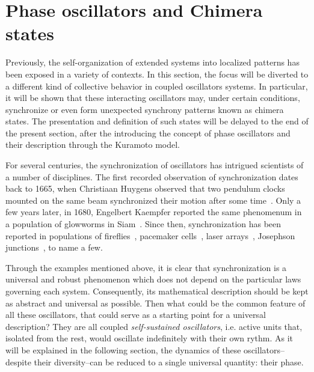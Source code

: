 \section{Phase oscillators and Chimera states}

Previously, the self-organization of extended systems into localized patterns has been exposed
in a variety of contexts. In this section, the focus will be diverted to a different kind of
collective behavior in coupled oscillators systems. In particular, it will be shown
that these interacting oscillators may, under certain conditions, synchronize or even
form unexpected synchrony patterns known as chimera states. The presentation and
definition of such states will be delayed to the end of the present section, after
the introducing the concept of phase oscillators and their description
through the Kuramoto model.

For several centuries, the synchronization of oscillators has intrigued scientists
of a number of disciplines. The first recorded observation of synchronization
dates back to 1665, when Christiaan Huygens observed that two pendulum clocks
mounted on the same beam synchronized their motion after some time~\cite{huygens1673horologium}.
Only a few years later, in 1680, Engelbert Kaempfer reported the same phenomenum
in a population of glowworms in Siam~\cite{kaempfer1727history}. Since then, synchronization has been
reported in populations of fireflies~\cite{buck1988synchronous}, pacemaker cells~\cite{michaels1987mechanisms}, 
laser arrays~\cite{vladimirov2003synchronization}, Josephson junctions~\cite{wiesenfeld1998frequency}, 
to name a few. 

Through the examples mentioned above, it is clear that synchronization is a universal
and robust phenomenon which does not depend on the particular laws governing each system.
Consequently, its mathematical description should be kept as abstract and universal as possible.
Then what could be the common feature of all these oscillators, that could serve as a starting
point for a universal description? They are all coupled {\em self-sustained oscillators}, i.e. active
units that, isolated from the rest, would oscillate indefinitely with their own rythm. 
As it will be explained in the following section, the dynamics of these oscillators--despite
their diversity--can be reduced to a single universal quantity: their phase.



